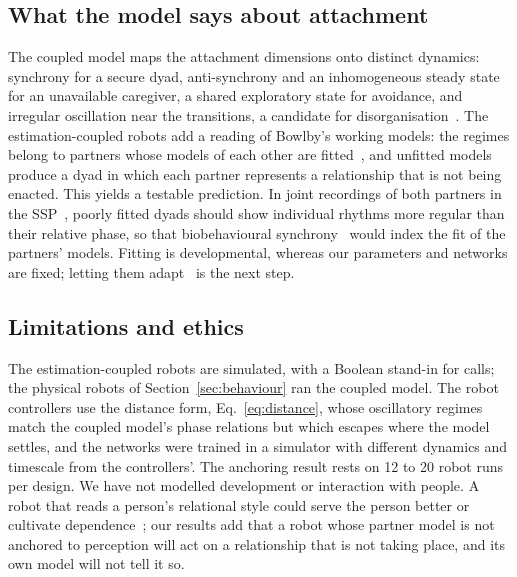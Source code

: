 \documentclass[journal]{IEEEtran}
\begin{document}
\subsection{What the model says about attachment}
The coupled model maps the attachment dimensions onto distinct dynamics: synchrony for a secure dyad, anti-synchrony and an inhomogeneous steady state for an unavailable caregiver, a shared exploratory state for avoidance, and irregular oscillation near the transitions, a candidate for disorganisation~\cite{Gagliardi2021our}. The estimation-coupled robots add a reading of Bowlby's working models: the regimes belong to partners whose models of each other are fitted~\cite{Bowlby1982}, and unfitted models produce a dyad in which each partner represents a relationship that is not being enacted. This yields a testable prediction. In joint recordings of both partners in the SSP~\cite{Prince2021,Chow2018representing}, poorly fitted dyads should show individual rhythms more regular than their relative phase, so that biobehavioural synchrony~\cite{Feldman2017} would index the fit of the partners' models. Fitting is developmental, whereas our parameters and networks are fixed; letting them adapt~\cite{Thelen1994,Stevens2009dynamic,Wilson2021} is the next step.

\subsection{Limitations and ethics}
The estimation-coupled robots are simulated, with a Boolean stand-in for calls; the physical robots of Section~\ref{sec:behaviour} ran the coupled model. The robot controllers use the distance form, Eq.~\eqref{eq:distance}, whose oscillatory regimes match the coupled model's phase relations but which escapes where the model settles, and the networks were trained in a simulator with different dynamics and timescale from the controllers'. The anchoring result rests on 12 to 20 robot runs per design. We have not modelled development or interaction with people. A robot that reads a person's relational style could serve the person better or cultivate dependence~\cite{Sharkey2010,Prescott2021}; our results add that a robot whose partner model is not anchored to perception will act on a relationship that is not taking place, and its own model will not tell it so.

\end{document}
